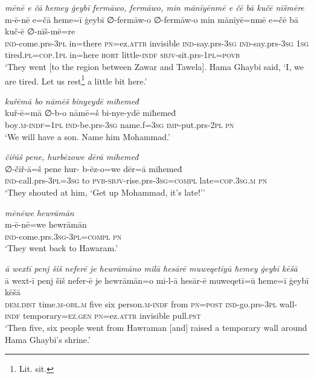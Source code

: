 \ea \label{BP.181}
\textit{mēnē e čā ħemey ġeybī fermāwo, fermāwo, min mānīyēnmē e čē bā kučē nīšmēre} \\ 
\gll m-ē-nē e=čā ħeme=ī ġeybī ∅-fermāw-o ∅-fermāw-o min mānīyē=nmē e=čē bā kuč-ē ∅-nīš-mē=re \\ 
 \textsc{ind-}come.prs\textsc{-3pl} in=there \textsc{pn}=ez.\textsc{attr} invisible \textsc{ind-}say.prs\textsc{-3sg} \textsc{ind-}say.prs\textsc{-3sg} \textsc{1sg} tired\textsc{.pl}\textsc{=cop}\textsc{.\textsc{1pl}} in=here \textsc{hort} little\textsc{-indf} \textsc{sbjv-}sit.prs\textsc{-\textsc{1pl}}\textsc{=\textsc{povb}} \\ 
\glt `They went [to the region between Zawar and Tawela]. Hama Ghaybi said, ‘I, we are tired. Let us rest\footnote{Lit. sit.} a little bit here.'
\z 
 
\ea \label{BP.186}
\textit{kuřēmā bo nāmēš binyeydē miħemeđ} \\ 
\gll kuř-ē=mā ∅-b-o nāmē=š bi-nye-ydē miħemeđ \\ 
 boy\textsc{.m}\textsc{-indf}\textsc{=\textsc{1pl}} \textsc{ind-}be.prs\textsc{-3sg} name.f\textsc{=3sg} \textsc{imp-}put.prs-\textsc{2pl} \textsc{pn} \\ 
\glt `We will have a son. Name him Mohammad.'
\z 
 
\ea \label{BP.192}
\textit{čiřāš pene, hurbēzowe dērā mihemeđ} \\ 
\gll ∅-čiř-ā=š pene hur- b-ēz-o=we dēr=ā mihemeđ \\ 
 \textsc{ind-}call.prs\textsc{-3pl}\textsc{=3sg} to \textsc{pvb-}\textsc{sbjv-}rise.prs\textsc{-3sg}\textsc{=compl} late\textsc{=cop}\textsc{.3sg}\textsc{.m} \textsc{pn} \\ 
\glt `They shouted at him, ‘Get up Mohammad, it’s late!’'
\z 
 
\ea \label{BP.201}
\textit{mēnēwe hewrāmān} \\ 
\gll m-ē-nē=we hewrāmān \\ 
 \textsc{ind-}come.prs\textsc{.3sg}\textsc{-3pl}\textsc{=compl} \textsc{pn} \\ 
\glt `They went back to Hawaram.'
\z 
 
\ea \label{BP.203}
\textit{ā wextī penj šiš neferē je hewrāmāno milā hesārē muweqetīyū ħemey ġeybī kēšā} \\ 
\gll ā wext-ī penj šiš nefer-ē je hewrāmān=o mi-l-ā hesār-ē muweqetī=ū ħeme=ī ġeybī kēšā \\ 
 \textsc{dem.dist} time\textsc{.m}\textsc{-obl}\textsc{.m} five six person\textsc{.m}\textsc{-indf} from \textsc{pn}\textsc{=\textsc{post}} \textsc{ind-}go.prs\textsc{-3pl} wall\textsc{-indf} temporary\textsc{=ez.gen} \textsc{pn}=ez.\textsc{attr} invisible pull\textsc{.pst} \\ 
\glt `Then five, six people went from Hawraman [and] raised a temporary wall around Hama Ghaybi’s shrine.'
\z 
 
